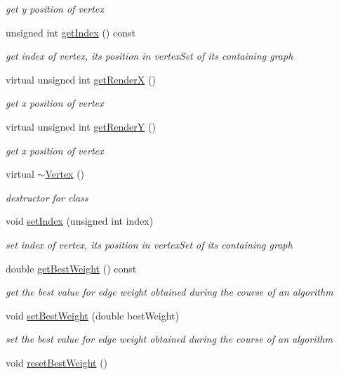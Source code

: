 \begin{DoxyCompactItemize}
\begin{DoxyCompactList}\small\item\em get y position of vertex \end{DoxyCompactList}\item 
unsigned int \hyperlink{class_vertex_ab265879de21dc8c08ece53523ceab31f}{get\+Index} () const 
\begin{DoxyCompactList}\small\item\em get index of vertex, its position in vertex\+Set of its containing graph \end{DoxyCompactList}\item 
virtual unsigned int \hyperlink{class_vertex_a4f6652186dc60a82b78a631cf0fcbed7}{get\+Render\+X} ()
\begin{DoxyCompactList}\small\item\em get x position of vertex \end{DoxyCompactList}\item 
virtual unsigned int \hyperlink{class_vertex_a7daa9b7383e6514bdf3dcfa9d755cd64}{get\+Render\+Y} ()
\begin{DoxyCompactList}\small\item\em get x position of vertex \end{DoxyCompactList}\item 
\hypertarget{class_vertex_ad7a0ce588b7f688dc4488a0f567d9155}{}virtual \hyperlink{class_vertex_ad7a0ce588b7f688dc4488a0f567d9155}{$\sim$\+Vertex} ()\label{class_vertex_ad7a0ce588b7f688dc4488a0f567d9155}

\begin{DoxyCompactList}\small\item\em destructor for class \end{DoxyCompactList}\item 
void \hyperlink{class_vertex_a587727c9d4e4cb9bbd7d9cda6ad2bc50}{set\+Index} (unsigned int index)
\begin{DoxyCompactList}\small\item\em set index of vertex, its position in vertex\+Set of its containing graph \end{DoxyCompactList}\item 
double \hyperlink{class_vertex_ab014e707dfcbee8a7a0e6a4251600dce}{get\+Best\+Weight} () const 
\begin{DoxyCompactList}\small\item\em get the best value for edge weight obtained during the course of an algorithm \end{DoxyCompactList}\item 
void \hyperlink{class_vertex_a72550c460ff084a7d167688bd9b3d7c2}{set\+Best\+Weight} (double best\+Weight)
\begin{DoxyCompactList}\small\item\em set the best value for edge weight obtained during the course of an algorithm \end{DoxyCompactList}\item 
\hypertarget{class_vertex_ab9e1ca696e9322fd8d32316ef752eee4}{}void \hyperlink{class_vertex_ab9e1ca696e9322fd8d32316ef752eee4}{reset\+Best\+Weight} ()\label{class_vertex_ab9e1ca696e9322fd8d32316ef752eee4}


\end{DoxyCompactItemize}
